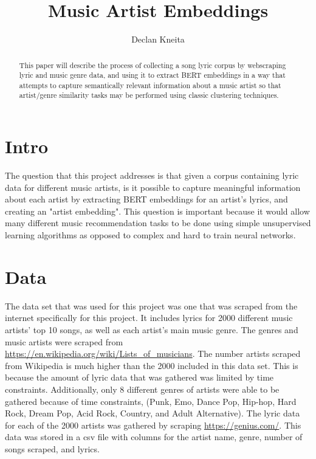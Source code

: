 \documentclass[11pt,a4paper]{article}
\title{Music Artist Embeddings}
\author{Declan Kneita}
\begin{document}
\maketitle

\begin{abstract}
This paper will describe the process of collecting a song lyric corpus by webscraping lyric and music genre data, and using it to extract BERT embeddings in a way that attempts to capture semantically relevant information about a music artist so that artist/genre similarity tasks may be performed using classic clustering techniques.
\end{abstract}

\section{Intro}

The question that this project addresses is that given a corpus containing lyric data for different music artists, is it possible to capture meaningful information about each artist by extracting BERT embeddings for an artist's lyrics, and creating an "artist embedding". This question is important because it would allow many different music recommendation tasks to be done using simple unsupervised learning algorithms as opposed to complex and hard to train neural networks.

\section{Data}

The data set that was used for this project was one that was scraped from the internet specifically for this project. It includes lyrics for 2000 different music artists' top 10 songs, as well as each artist's main music genre. The genres and music artists were scraped from \href{https://en.wikipedia.org/wiki/Lists\_of\_musicians}{https://en.wikipedia.org/wiki/Lists\_of\_musicians}. The number artists scraped from Wikipedia is much higher than the 2000 included in this data set. This is because the amount of lyric data that was gathered was limited by time constraints. Additionally, only 8 different genres of artists were able to be gathered because of time constraints, (Punk, Emo, Dance Pop, Hip-hop, Hard Rock, Dream Pop, Acid Rock, Country, and Adult Alternative). The lyric data for each of the 2000 artists was gathered by scraping \href{https://genius.com/}{https://genius.com/}. This data was stored in a csv file with columns for the artist name, genre, number of songs scraped, and lyrics.
\end{document}
